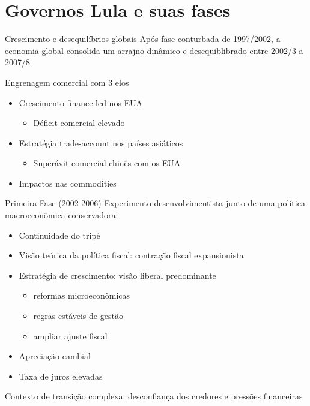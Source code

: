 \documentclass[presentation]{beamer}
\begin{document}
\section{Governos Lula e suas fases}
\label{sec:org909d258}

\begin{frame}[label={sec:orgc04ef81}]{Crescimento e desequilíbrios globais \cite{carneiroSupremaciaDosMercados2006}}
Após fase conturbada de 1997/2002, a economia global consolida um arrajno dinâmico e desequiblibrado entre 2002/3 a 2007/8

\alert{Engrenagem comercial com 3 elos}
\begin{itemize}
\item Crescimento finance-led nos EUA
\begin{itemize}
\item Déficit comercial elevado
\end{itemize}
\item Estratégia trade-account nos países asiáticos
\begin{itemize}
\item Superávit comercial chinês com os EUA
\end{itemize}
\item Impactos nas commodities
\end{itemize}
\end{frame}

\begin{frame}[label={sec:orga11276d}]{Primeira Fase (2002-2006)}
Experimento desenvolvimentista junto de uma política macroeconômica conservadora:
\begin{itemize}
\item Continuidade do tripé
\item Visão teórica da \alert{política fiscal:} contração fiscal expansionista
\item \alert{Estratégia de crescimento:} visão liberal predominante
\begin{itemize}
\item reformas microeconômicas
\item regras estáveis de gestão
\item ampliar ajuste fiscal
\end{itemize}
\item Apreciação cambial
\item Taxa de juros elevadas
\end{itemize}

\alert{Contexto de transição complexa:} desconfiança dos credores e pressões financeiras
\end{frame}
\end{document}
